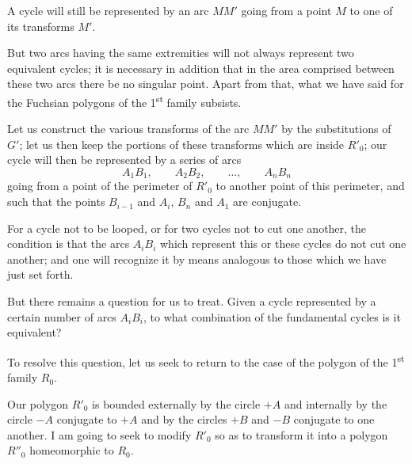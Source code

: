 \documentclass{article}
\begin{document}
A cycle will still be represented by an arc $MM'$ going from a point $M$ to one of its transforms $M'$.

But two arcs having the same extremities will not always represent two equivalent cycles; it is necessary in addition that in the area comprised between these two arcs there be no singular point. Apart from that, what we have said for the Fuchsian polygons of the 1\textsuperscript{st} family subsists.

Let us construct the various transforms of the arc $MM'$ by the substitutions of $G'$; let us then keep the portions of these transforms which are inside $R'_{0}$; our cycle will then be represented by a series of arcs
\[ A_{1}B_{1}, \qquad A_{2}B_{2}, \qquad \ldots, \qquad A_{n}B_{n} \]
going from a point of the perimeter of $R'_{0}$ to another point of this perimeter, and such that the points $B_{i-1}$ and $A_{i}$, $B_{n}$ and $A_{1}$ are conjugate.

For a cycle not to be looped, or for two cycles not to cut one another, the condition is that the arcs $A_{i}B_{i}$ which represent this or these cycles do not cut one another; and one will recognize it by means analogous to those which we have just set forth.

But there remains a question for us to treat. Given a cycle represented by a certain number of arcs $A_{i}B_{i}$, to what combination of the fundamental cycles is it equivalent?


To resolve this question, let us seek to return to the case of the polygon of the 1\textsuperscript{st} family $R_{0}$.


Our polygon $R'_{0}$ is bounded externally by the circle $+A$ and internally by the circle $-A$ conjugate to $+A$ and by the circles $+B$ and $-B$ conjugate to one another. I am going to seek to modify $R'_{0}$ so as to transform it into a polygon $R''_{0}$ homeomorphic to $R_{0}$.
\end{document}
